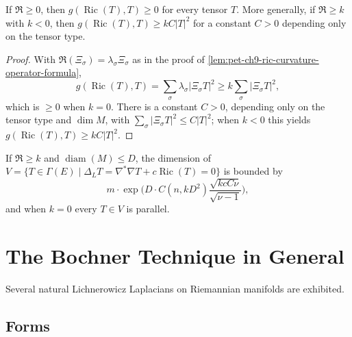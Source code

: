 \begin{corollary}[Corollary 9.3.4]
  \label{cor:pet-ch9-ric-nonneg-curvature-operator}
  If $\mathfrak{R}\ge0$, then $g(\operatorname{Ric}(T),T)\ge0$ for every tensor $T$. More
  generally, if $\mathfrak{R}\ge k$ with $k<0$, then $g(\operatorname{Ric}(T),T)\ge kC|T|^2$
  for a constant $C>0$ depending only on the tensor type.
\end{corollary}
\begin{proof}
  With $\mathfrak{R}(\Xi_\sigma)=\lambda_\sigma\Xi_\sigma$ as in the proof of
  \cref{lem:pet-ch9-ric-curvature-operator-formula},
  \[
    g(\operatorname{Ric}(T),T)=\sum_\sigma\lambda_\sigma|\Xi_\sigma T|^2\ge k\sum_\sigma|\Xi_\sigma T|^2,
  \]
  which is $\ge0$ when $k=0$. There is a constant $C>0$, depending only on the
  tensor type and $\dim M$, with $\sum_\sigma|\Xi_\sigma T|^2\le C|T|^2$; when
  $k<0$ this yields $g(\operatorname{Ric}(T),T)\ge kC|T|^2$.
\end{proof}

\begin{theorem}[Theorem 9.3.5]
  \label{thm:pet-ch9-lichnerowicz-dimension-estimate}
  If $\mathfrak{R}\ge k$ and $\operatorname{diam}(M)\le D$, the dimension of
  $V=\{T\in\Gamma(E)\mid\Delta_LT=\nabla^*\nabla T+c\operatorname{Ric}(T)=0\}$ is bounded by
  \[
    m\cdot\exp\Big(D\cdot C(n,kD^2)\frac{\sqrt{kcC\nu}}{\sqrt{\nu-1}}\Big),
  \]
  and when $k=0$ every $T\in V$ is parallel.
\end{theorem}

\section{The Bochner Technique in General}

Several natural Lichnerowicz Laplacians on Riemannian manifolds are exhibited.

\subsection{Forms}


